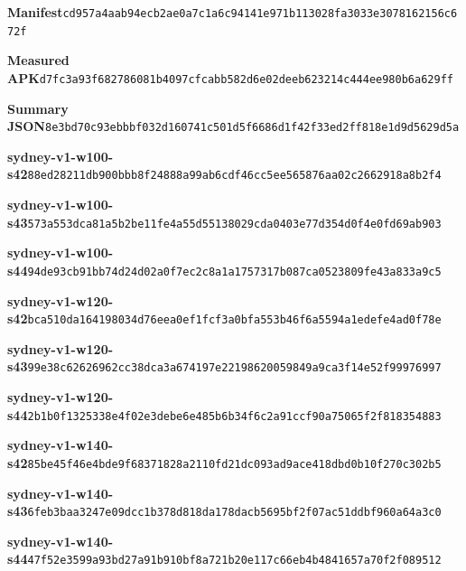 \documentclass[10pt,a4paper]{article}
\begin{document}
\noindent\textbf{Manifest}\quad\texttt{cd957a4aab94ecb2\allowbreak{}ae0a7c1a6c94141e\allowbreak{}971b113028fa3033\allowbreak{}e3078162156c672f}\par
\noindent\textbf{Measured APK}\quad\texttt{d7fc3a93f6827860\allowbreak{}81b4097cfcabb582\allowbreak{}d6e02deeb623214c\allowbreak{}444ee980b6a629ff}\par
\noindent\textbf{Summary JSON}\quad\texttt{8e3bd70c93ebbbf0\allowbreak{}32d160741c501d5f\allowbreak{}6686d1f42f33ed2f\allowbreak{}f818e1d9d5629d5a}\par
\noindent\textbf{sydney-v1-w100-s42}\quad\texttt{88ed28211db900bb\allowbreak{}b8f24888a99ab6cd\allowbreak{}f46cc5ee565876aa\allowbreak{}02c2662918a8b2f4}\par
\noindent\textbf{sydney-v1-w100-s43}\quad\texttt{573a553dca81a5b2\allowbreak{}be11fe4a55d55138\allowbreak{}029cda0403e77d35\allowbreak{}4d0f4e0fd69ab903}\par
\noindent\textbf{sydney-v1-w100-s44}\quad\texttt{94de93cb91bb74d2\allowbreak{}4d02a0f7ec2c8a1a\allowbreak{}1757317b087ca052\allowbreak{}3809fe43a833a9c5}\par
\noindent\textbf{sydney-v1-w120-s42}\quad\texttt{bca510da16419803\allowbreak{}4d76eea0ef1fcf3a\allowbreak{}0bfa553b46f6a559\allowbreak{}4a1edefe4ad0f78e}\par
\noindent\textbf{sydney-v1-w120-s43}\quad\texttt{99e38c62626962cc\allowbreak{}38dca3a674197e22\allowbreak{}198620059849a9ca\allowbreak{}3f14e52f99976997}\par
\noindent\textbf{sydney-v1-w120-s44}\quad\texttt{2b1b0f1325338e4f\allowbreak{}02e3debe6e485b6b\allowbreak{}34f6c2a91ccf90a7\allowbreak{}5065f2f818354883}\par
\noindent\textbf{sydney-v1-w140-s42}\quad\texttt{85be45f46e4bde9f\allowbreak{}68371828a2110fd2\allowbreak{}1dc093ad9ace418d\allowbreak{}bd0b10f270c302b5}\par
\noindent\textbf{sydney-v1-w140-s43}\quad\texttt{6feb3baa3247e09d\allowbreak{}cc1b378d818da178\allowbreak{}dacb5695bf2f07ac\allowbreak{}51ddbf960a64a3c0}\par
\noindent\textbf{sydney-v1-w140-s44}\quad\texttt{47f52e3599a93bd2\allowbreak{}7a91b910bf8a721b\allowbreak{}20e117c66eb4b484\allowbreak{}1657a70f2f089512}\par
\end{document}
